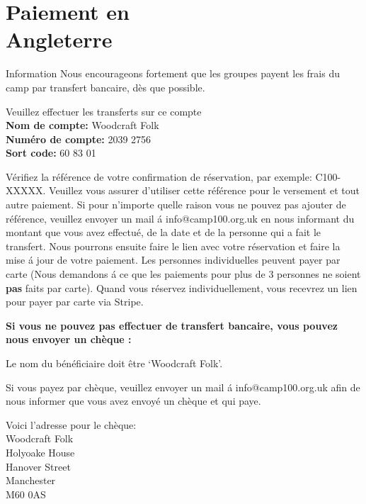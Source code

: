 \documentclass[a4paper, 11pt]{report}
\begin{document}
\makedocumenttitlepage

\tableofcontents

\chapter[Paiement en Angleterre]{Paiement en\\ Angleterre}

\begin{callout-green}{Information}
Nous encourageons fortement que les groupes payent les frais du camp par transfert bancaire, d\`es que possible.
\end{callout-green}

Veuillez effectuer les transferts sur ce compte\\
\textbf{Nom de compte:} Woodcraft Folk\\
\textbf{Num\'ero de compte:} 2039 2756\\
\textbf{Sort code:} 60 83 01

V\'erifiez la r\'ef\'erence de votre confirmation de r\'eservation, par exemple: C100-XXXXX. Veuillez vous assurer d'utiliser cette r\'ef\'erence pour le versement et tout autre paiement.
Si pour n'importe quelle raison vous ne pouvez pas ajouter de r\'ef\'erence, veuillez envoyer un mail \'a info@camp100.org.uk en nous informant du montant que vous avez effectu\'e, de la date et de la personne qui a fait le transfert. Nous pourrons ensuite faire le lien avec votre r\'eservation et faire la mise \'a jour de votre paiement.
Les personnes individuelles peuvent payer par carte (Nous demandons \'a ce que les paiements pour plus de 3 personnes ne soient \textbf{pas} faits par carte). Quand vous r\'eservez individuellement, vous recevrez un lien pour payer par carte via Stripe.

\textbf{Si vous ne pouvez pas effectuer de transfert bancaire, vous pouvez nous envoyer un ch\`eque :}

Le nom du b\'en\'eficiaire doit \^etre `Woodcraft Folk'.

Si vous payez par ch\`eque, veuillez envoyer un mail \'a info@camp100.org.uk afin de nous informer que vous avez envoy\'e un ch\`eque et qui paye.  

Voici l'adresse pour le ch\`eque:\\
Woodcraft Folk\\
Holyoake House\\
Hanover Street\\
Manchester \\
M60 0AS\\
\end{document}
